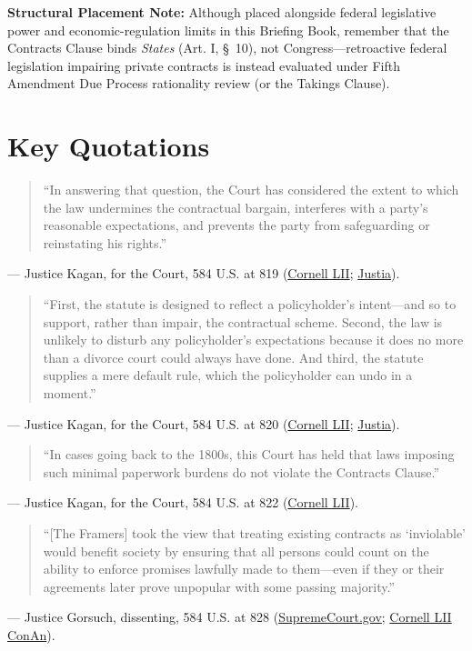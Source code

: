 \documentclass[12pt]{article}
\begin{document}
\textbf{Structural Placement Note:} Although placed alongside federal legislative power and economic-regulation limits in this Briefing Book, remember that the Contracts Clause binds \textit{States} (Art. I, \S~10), not Congress---retroactive federal legislation impairing private contracts is instead evaluated under Fifth Amendment Due Process rationality review (or the Takings Clause).

\section{Key Quotations}
\begin{quote}
``In answering that question, the Court has considered the extent to which the law undermines the contractual bargain, interferes with a party's reasonable expectations, and prevents the party from safeguarding or reinstating his rights.''
\end{quote}
\noindent --- Justice Kagan, for the Court, 584 U.S. at 819 (\href{https://www.law.cornell.edu/supremecourt/text/16-1432}{Cornell LII}; \href{https://supreme.justia.com/cases/federal/us/584/16-1432/}{Justia}).

\begin{quote}
``First, the statute is designed to reflect a policyholder's intent---and so to support, rather than impair, the contractual scheme. Second, the law is unlikely to disturb any policyholder's expectations because it does no more than a divorce court could always have done. And third, the statute supplies a mere default rule, which the policyholder can undo in a moment.''
\end{quote}
\noindent --- Justice Kagan, for the Court, 584 U.S. at 820 (\href{https://www.law.cornell.edu/supremecourt/text/16-1432}{Cornell LII}; \href{https://supreme.justia.com/cases/federal/us/584/16-1432/}{Justia}).

\begin{quote}
``In cases going back to the 1800s, this Court has held that laws imposing such minimal paperwork burdens do not violate the Contracts Clause.''
\end{quote}
\noindent --- Justice Kagan, for the Court, 584 U.S. at 822 (\href{https://www.law.cornell.edu/supremecourt/text/16-1432}{Cornell LII}).

\begin{quote}
``[The Framers] took the view that treating existing contracts as `inviolable' would benefit society by ensuring that all persons could count on the ability to enforce promises lawfully made to them---even if they or their agreements later prove unpopular with some passing majority.''
\end{quote}
\noindent --- Justice Gorsuch, dissenting, 584 U.S. at 828 (\href{https://www.supremecourt.gov/opinions/17pdf/584us2r49_74h3.pdf}{SupremeCourt.gov}; \href{https://www.law.cornell.edu/constitution-conan/article-1/section-10/clause-1/historical-background-on-the-contract-clause}{Cornell LII ConAn}).
\end{document}
